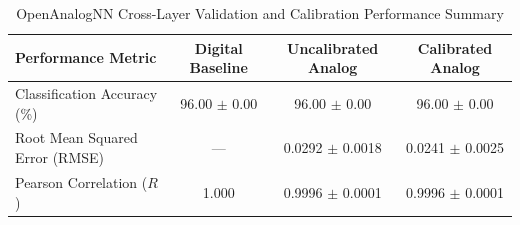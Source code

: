 \begin{table}[htbp]
\centering
\caption{OpenAnalogNN Cross-Layer Validation and Calibration Performance Summary}
\label{tab:analog_stats}
\begin{tabular}{lccc}
\hline
\textbf{Performance Metric} & \textbf{Digital Baseline} & \textbf{Uncalibrated Analog} & \textbf{Calibrated Analog} \\
\hline
Classification Accuracy (\%) & 96.00 $\pm$ 0.00 & 96.00 $\pm$ 0.00 & 96.00 $\pm$ 0.00 \\
Root Mean Squared Error (RMSE) & --- & 0.0292 $\pm$ 0.0018 & 0.0241 $\pm$ 0.0025 \\
Pearson Correlation ($R$) & 1.000 & 0.9996 $\pm$ 0.0001 & 0.9996 $\pm$ 0.0001 \\
\hline
\end{tabular}
\end{table}